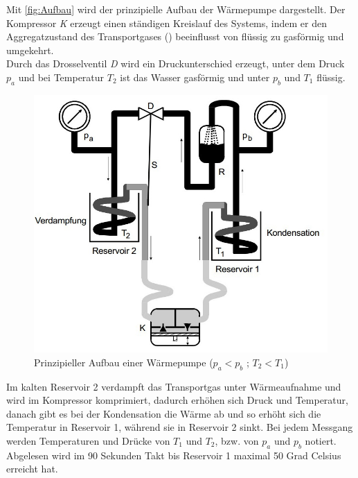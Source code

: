 
Mit \autoref{fig:Aufbau} wird der prinzipielle Aufbau der Wärmepumpe dargestellt. Der Kompressor \emph{K} erzeugt einen ständigen Kreislauf des Systems, indem er den Aggregatzustand des Transportgases () beeinflusst von flüssig zu gasförmig und umgekehrt. \\
Durch das Drosselventil \emph{D} wird ein Druckunterschied erzeugt, unter dem Druck $p_a$ und bei Temperatur $T_2$ ist das Wasser gasförmig und unter $p_b$ und $T_1$ flüssig. \\

\begin{figure}
	\includegraphics*[scale=0.45]{Grafiken/Aufbau.jpg}
	\caption{Prinzipieller Aufbau einer Wärmepumpe ($p_a < p_b$ ; $T_2 < T_1$)}
	\label{fig:Aufbau}
\end{figure}

Im kalten Reservoir 2 verdampft das Transportgas unter Wärmeaufnahme und wird im Kompressor komprimiert, dadurch erhöhen sich Druck und Temperatur, danach gibt es bei der Kondensation die Wärme ab und so erhöht sich die Temperatur in Reservoir 1, während sie in Reservoir 2 sinkt.
Bei jedem Messgang werden Temperaturen und Drücke von $T_1$ und $T_2$, bzw. von $p_a$ und $p_b$ notiert. Abgelesen wird im
90 Sekunden Takt bis Reservoir 1 maximal 50 Grad Celsius erreicht hat.
